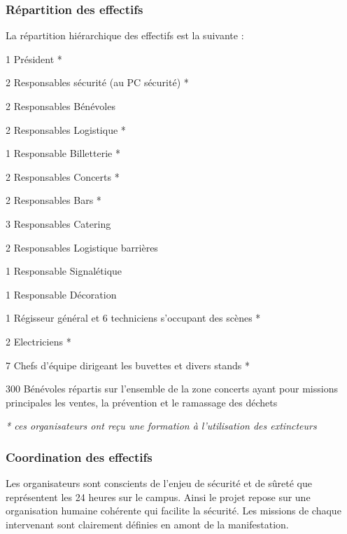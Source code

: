 \documentclass[hidelinks, paper=a4, fontsize=13pt]{report}
\begin{document}
\subsubsection{Répartition des effectifs}
La répartition hiérarchique des effectifs est la suivante :
\begin{list}{•}{}
	\item 1 Président *
	\item 2 Responsables sécurité (au PC sécurité) *
	\item 2 Responsables Bénévoles
	\item 2 Responsables Logistique *
	\item 1 Responsable Billetterie *
	\item 2 Responsables Concerts *
	\item 2 Responsables Bars *
	\item 3 Responsables Catering
	\item 2 Responsables Logistique barrières
	\item 1 Responsable Signalétique
	\item 1 Responsable Décoration
	\item 1 Régisseur général et 6 techniciens s’occupant des scènes * %
	\item 2 Electriciens *
	\item 7 Chefs d’équipe dirigeant les buvettes et divers stands * %
	\item 300 Bénévoles répartis sur l’ensemble de la zone concerts ayant pour missions principales les ventes, la prévention et le ramassage des déchets
\end{list}

\textit{* ces organisateurs ont reçu une formation à l'utilisation des extincteurs}

\subsubsection{Coordination des effectifs}

Les organisateurs sont conscients de l’enjeu de sécurité et de sûreté que représentent les 24 heures sur le campus. Ainsi le projet repose sur une organisation humaine cohérente qui facilite la sécurité. Les missions de chaque intervenant sont clairement définies en amont de la manifestation.
\end{document}
